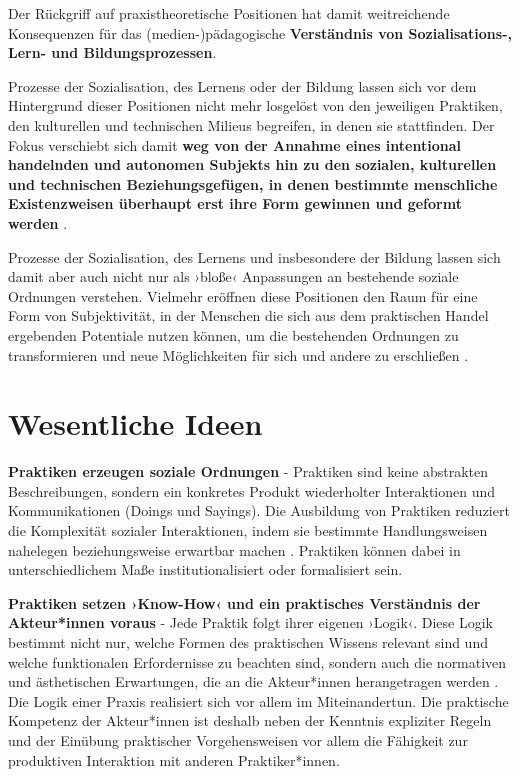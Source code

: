 \documentclass[
  a4paper,
]{book}
\begin{document}
Der Rückgriff auf praxistheoretische Positionen hat damit weitreichende Konsequenzen für das (medien-)pädagogische \textbf{Verständnis von Sozialisations-, Lern- und Bildungsprozessen}.

Prozesse der Sozialisation, des Lernens oder der Bildung lassen sich vor dem Hintergrund dieser Positionen nicht mehr losgelöst von den jeweiligen Praktiken, den kulturellen und technischen Milieus begreifen, in denen sie stattfinden. Der Fokus verschiebt sich damit \textbf{weg von der Annahme eines intentional handelnden und autonomen Subjekts hin zu den sozialen, kulturellen und technischen Beziehungsgefügen, in denen bestimmte menschliche Existenzweisen überhaupt erst ihre Form gewinnen und geformt werden} \citep[vgl. z.B.][]{fenwickEmergingApproachesEducational2011, munte-goussarMedienbildungSchulkulturUnd2016, richterBildungSchnittstelleKultureller2020}.

Prozesse der Sozialisation, des Lernens und insbesondere der Bildung lassen sich damit aber auch nicht nur als ›bloße‹ Anpassungen an bestehende soziale Ordnungen verstehen. Vielmehr eröffnen diese Positionen den Raum für eine Form von Subjektivität, in der Menschen die sich aus dem praktischen Handel ergebenden Potentiale nutzen können, um die bestehenden Ordnungen zu transformieren und neue Möglichkeiten für sich und andere zu erschließen \citep[vgl. z.B.][]{alkemeyerBefahigenPraxistheoretischeUberlegungen2017}.

\section{Wesentliche Ideen}\label{wesentliche-ideen}

\textbf{Praktiken erzeugen soziale Ordnungen} - Praktiken sind keine abstrakten Beschreibungen, sondern ein konkretes Produkt wiederholter Interaktionen und Kommunikationen (Doings und Sayings). Die Ausbildung von Praktiken reduziert die Komplexität sozialer Interaktionen, indem sie bestimmte Handlungsweisen nahelegen beziehungsweise erwartbar machen \citep[vgl. z.B.][]{bickhardSocialOntologyPersons2003, bickhardSocialOntologyConvention2008}. Praktiken können dabei in unterschiedlichem Maße institutionalisiert oder formalisiert sein.

\textbf{Praktiken setzen ›Know-How‹ und ein praktisches Verständnis der Akteur*innen voraus} - Jede Praktik folgt ihrer eigenen ›Logik‹. Diese Logik bestimmt nicht nur, welche Formen des praktischen Wissens relevant sind und welche funktionalen Erfordernisse zu beachten sind, sondern auch die normativen und ästhetischen Erwartungen, die an die Akteur*innen herangetragen werden \citep[vgl. z.B.][]{alkemeyerBefahigenPraxistheoretischeUberlegungen2017}. Die Logik einer Praxis realisiert sich vor allem im Miteinandertun. Die praktische Kompetenz der Akteur*innen ist deshalb neben der Kenntnis expliziter Regeln und der Einübung praktischer Vorgehensweisen vor allem die Fähigkeit zur produktiven Interaktion mit anderen Praktiker*innen.
\end{document}

